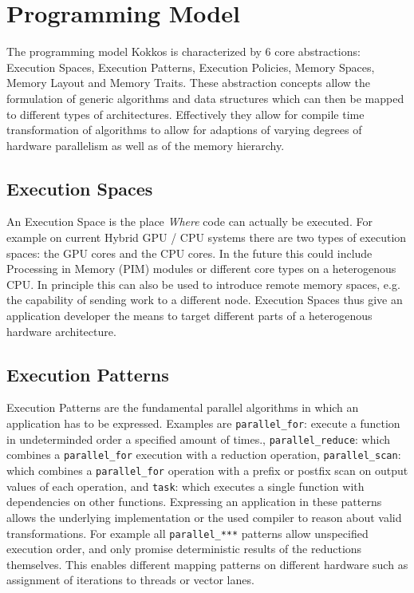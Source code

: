 
\chapter{Programming Model}

The programming model Kokkos is characterized by 6 core abstractions: Execution Spaces, Execution Patterns, Execution Policies, Memory Spaces, Memory Layout and Memory Traits. 
These abstraction concepts allow the formulation of generic algorithms and data structures which can then be mapped to different types of architectures. 
Effectively they allow for compile time transformation of algorithms to allow for adaptions of varying degrees of hardware parallelism as well as of the memory hierarchy. 

\section{Execution Spaces}

An Execution Space is the place {\it Where} code can actually be executed. 
For example on current Hybrid GPU / CPU systems there are two types of execution spaces: the GPU cores and the CPU cores. 
In the future this could include Processing in Memory (PIM) modules or different core types on a heterogenous CPU.
In principle this can also be used to introduce remote memory spaces, e.g. the capability of sending work to a different node.
Execution Spaces thus give an application developer the means to target different parts of a heterogenous hardware architecture.

\section{Execution Patterns}

Execution Patterns are the fundamental parallel algorithms in which an application has to be expressed.
Examples are \lstinline|parallel_for|: execute a function in undeterminded order a specified amount of times.,
\lstinline|parallel_reduce|: which combines a \lstinline|parallel_for| execution with a reduction operation,
\lstinline|parallel_scan|: which combines a \lstinline|parallel_for| operation with a prefix or postfix scan on output values of each operation, and
\lstinline|task|: which executes a single function with dependencies on other functions.
Expressing an application in these patterns allows the underlying implementation or the used compiler to reason about valid transformations.
For example all \lstinline|parallel_***| patterns allow unspecified execution order, and only promise deterministic results of the reductions themselves.
This enables different mapping patterns on different hardware such as assignment of iterations to threads or vector lanes. 

